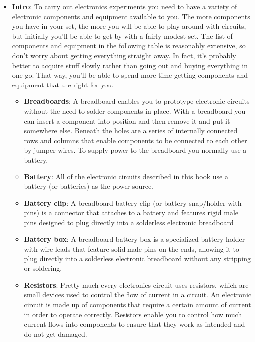 \documentclass{report}
\begin{document}
    \pagebreak 
    \begin{itemize}
        \item \textbf{Intro}: To carry out electronics experiments you need to have a variety of electronic components and equipment available to you. The more components you have in your set, the more you will be able to play around with circuits, but initially you'll be able to get by with a fairly modest set.        
            \bigbreak \noindent 
            The list of components and equipment in the following table is reasonably extensive, so don't worry about getting everything straight away. In fact, it's probably better to acquire stuff slowly rather than going out and buying everything in one go. That way, you'll be able to spend more time getting components and equipment that are right for you.
            \begin{itemize}
                \item \textbf{Breadboards}: A breadboard enables you to prototype electronic circuits without the need to solder components in place. With a breadboard you can insert a component into position and then remove it and put it somewhere else.
                    \bigbreak \noindent 
                    Beneath the holes are a series of internally connected rows and columns that enable components to be connected to each other by jumper wires.
                    \bigbreak \noindent 
                    To supply power to the breadboard you normally use a battery.
                \item \textbf{Battery}: All of the electronic circuits described in this book use a battery (or batteries) as the power source.
                \item \textbf{Battery clip}: A breadboard battery clip (or battery snap/holder with pins) is a connector that attaches to a battery and features rigid male pins designed to plug directly into a solderless electronic breadboard
                \item \textbf{Battery box}: A breadboard battery box is a specialized battery holder with wire leads that feature solid male pins on the ends, allowing it to plug directly into a solderless electronic breadboard without any stripping or soldering.
                \item \textbf{Resistors}: Pretty much every electronics circuit uses resistors, which are small devices used to control the flow of current in a circuit.
                    \bigbreak \noindent 
                    An electronic circuit is made up of components that require a certain amount of current in order to operate correctly. Resistors enable you to control how much current flows into components to ensure that they work as intended and do not get damaged.

\end{itemize}
\end{itemize}
\end{document}
